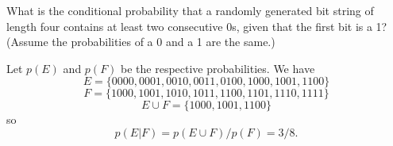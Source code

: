 \documentclass[../main.tex]{subfiles}
\begin{document}
What is the conditional probability that a randomly generated bit string of length four contains at least two consecutive 0s, given that the first bit is a 1?
(Assume the probabilities of a 0 and a 1 are the same.)

\solution
Let $p(E)$ and $p(F)$ be the respective probabilities.
We have
\[
	E = \{0000, 0001, 0010, 0011, 0100, 1000, 1001, 1100\}
\]
\[
	F = \{1000, 1001, 1010, 1011, 1100, 1101, 1110, 1111\}
\]
\[
	E \cup F = \{1000, 1001, 1100\}
\]
so
\[
p(E|F) = p(E \cup F)/p(F) = 3/8.
\]
\end{document}
